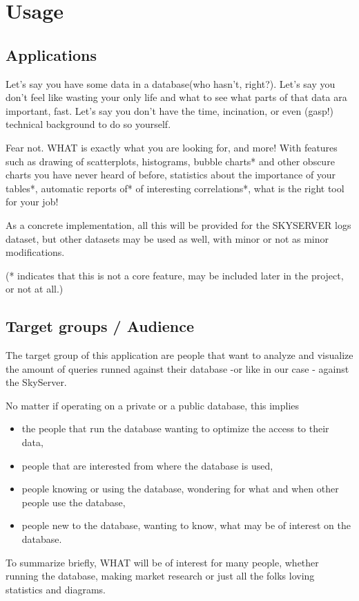 \section{Usage}

\subsection{Applications}
Let's say you have some data in a database(who hasn't, right?).
Let's say you don't feel like wasting your only life and what to see what parts of that data ara important, fast.
Let's say you don't have the time, incination, or even (gasp!) technical background to do so yourself.

Fear not. WHAT is exactly what you are looking for, and more!
With features such as drawing of scatterplots, histograms, bubble charts* 
and other obscure charts you have never heard of before, statistics about the importance of your tables*,
automatic reports of* of interesting correlations*, what is the right tool for your job!

As a concrete implementation, all this will be provided for the SKYSERVER logs dataset, but other datasets may be
used as well, with minor or not as minor modifications.

(* indicates that this is not a core feature, may be included later in the project, or not at all.)

\subsection{Target groups / Audience}

The target group of this application are people that want to analyze 
and visualize the amount of queries runned against their database -or like
in our case - against the SkyServer.

No matter if operating on a private or a public database, this implies
\begin{itemize}
  \item the people that run the database wanting to optimize the access to
  	their data,
  	
  \item people that are interested from where the database is used,

  \item people knowing or using the database, wondering for what and when other people
  use the database,
  
  \item people new to the database, wanting to know, what may be of interest
  on the database.

\end{itemize}
To summarize briefly, WHAT will be of interest for many people, 
whether running the database, making market research or just all the folks
loving statistics and diagrams.

